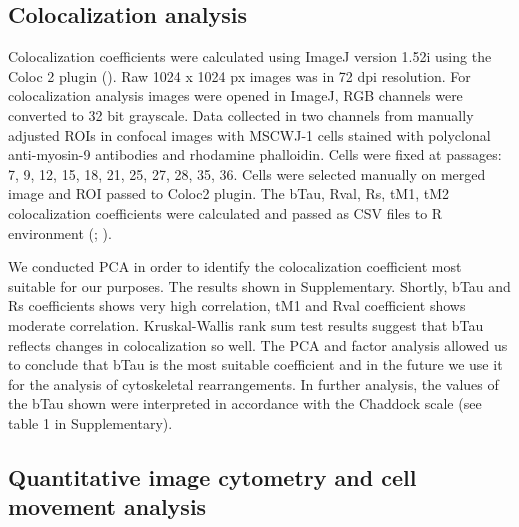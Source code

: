 \documentclass[alpha-refs]{wiley-article}
\begin{document}
\subsection{Colocalization analysis}

Colocalization coefficients were calculated using ImageJ version 1.52i using the Coloc 2 plugin (\cite{rueden2017imagej2}).
Raw 1024 x 1024 px images was in 72 dpi resolution.
For colocalization analysis images were opened in ImageJ, RGB channels were converted to 32 bit grayscale.
Data collected in two channels from manually adjusted ROIs in confocal images with MSCWJ-1 cells stained with polyclonal anti-myosin-9 antibodies and rhodamine phalloidin. Cells were fixed at passages: 7, 9, 12, 15, 18, 21, 25, 27, 28, 35, 36.
Cells were selected manually on merged image and ROI passed to Coloc2 plugin.
The bTau, Rval, Rs, tM1, tM2 colocalization coefficients were calculated and passed as CSV files to R environment (\cite{adler2008replicate}; \cite{bergholm2010analysis}).

We conducted PCA in order to identify the colocalization coefficient most suitable for our purposes.
The results shown in Supplementary.
Shortly, bTau and Rs coefficients shows very high correlation, tM1 and Rval coefficient shows moderate correlation.
Kruskal-Wallis rank sum test results suggest that bTau reflects changes in colocalization so well.
The PCA and factor analysis allowed us to conclude that bTau is the most suitable coefficient and in the future we use it for the analysis of cytoskeletal rearrangements.
In further analysis, the values of the bTau shown were interpreted in accordance with the Chaddock scale (see table 1 in Supplementary).

\subsection{Quantitative image cytometry and cell movement analysis}
\end{document}
